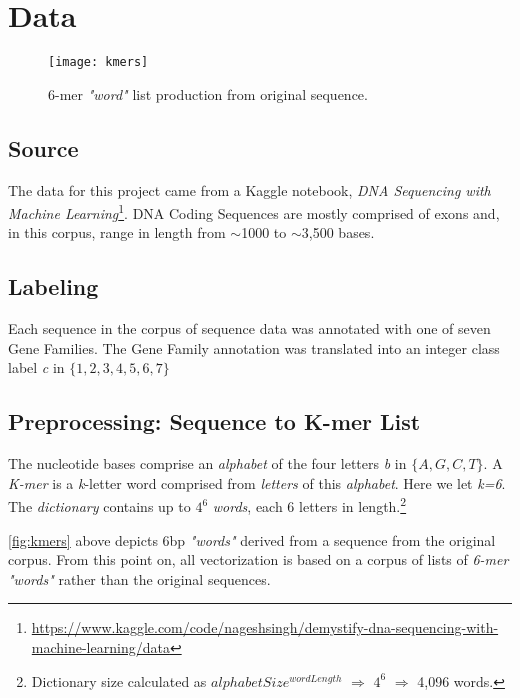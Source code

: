 \section{Data}
%
  \begin{figure}
    \centering
    \texttt{[image: kmers]}
    \caption{%
      6-mer \textit{"word"} list production from original sequence.
    }
    \label{fig:kmers}
  \end{figure}
%
\subsection{Source}

The data for this project came from a Kaggle notebook, \textit{DNA Sequencing with Machine Learning}\footnote{\url{https://www.kaggle.com/code/nageshsingh/demystify-dna-sequencing-with-machine-learning/data}}.
%
DNA Coding Sequences are mostly comprised of exons and, in this corpus, range in length from  $\sim$1000 to $\sim$3,500 bases.

\subsection{Labeling}
Each sequence in the corpus of sequence data was annotated with one of seven Gene Families.  The Gene Family annotation was translated into an integer class label \textit{c} in $\{1, 2, 3, 4, 5, 6, 7\}$


\subsection{Preprocessing: Sequence to K-mer List}
%
The nucleotide bases comprise an \textit{alphabet} of the four letters \textit{b} in $\{A, G, C, T\}$.  A \textit{K-mer} is a \textit{k}-letter word comprised from \textit{letters} of this \textit{alphabet}.  Here we let \textit{k=6}.  The \textit{dictionary} contains up to $4^{6}$ \textit{words}, each 6 letters in length.\footnote{Dictionary size calculated as $alphabetSize^{wordLength}$ $\Rightarrow$ $4^{6}$ $\Rightarrow$ 4,096 words.}

\autoref{fig:kmers} above depicts 6bp \textit{"words"} derived from a sequence from the original corpus.  From this point on, all vectorization is based on a corpus of lists of \textit{6-mer "words"} rather than the original sequences.
%
